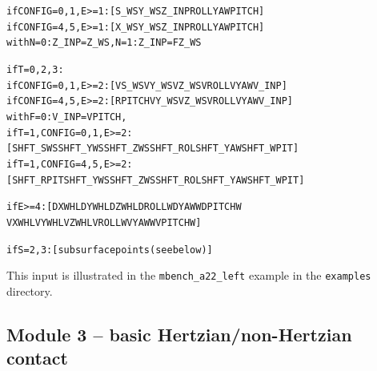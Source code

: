 \documentclass[12pt]{report}
\renewcommand{\magenta}[1]{}
\begin{document}
\begin{alltt}
if CONFIG=0,1, E>=1: [ S\_WS    Y\_WS    Z\_INP  ROLL    YAW    PITCH    ]
if CONFIG=4,5, E>=1: [ X\_WS    Y\_WS    Z\_INP  ROLL    YAW    PITCH    ]
   with  N=0:\magenta{  } Z\_INP = Z\_WS,   N=1: Z\_INP = FZ\_WS

if T=0,2,3:
if CONFIG=0,1, E>=2: [ VS\_WS   VY\_WS   VZ\_WS  VROLL   VYAW   V\_INP    ]
if CONFIG=4,5, E>=2: [ RPITCH  VY\_WS   VZ\_WS  VROLL   VYAW   V\_INP    ]
   with  F=0\magenta{,3}: V\_INP = VPITCH, \magenta{F=1: V\_INP = FX\_WS, F=2: V\_INP = MY\_WS}
if T=1, CONFIG=0,1, E>=2: 
          [ SHFT\_SWS   SHFT\_YWS  SHFT\_ZWS  SHFT\_ROL  SHFT\_YAW  SHFT\_WPIT ]
if T=1, CONFIG=4,5, E>=2: 
          [ SHFT\_RPIT  SHFT\_YWS  SHFT\_ZWS  SHFT\_ROL  SHFT\_YAW  SHFT\_WPIT ]


if E>=4:    [ DXWHL    DYWHL    DZWHL    DROLLW   DYAWW    DPITCHW 
              VXWHL    VYWHL    VZWHL    VROLLW   VYAWW    VPITCHW    ]


if S=2,3: [ subsurface points (see below) ]
\end{alltt}
This input is illustrated in the {\tt mbench\_a22\_left} example in the
{\tt examples} directory.

\color{black}


\subsection{Module 3 -- basic Hertzian/non-Hertzian contact}
\end{document}
